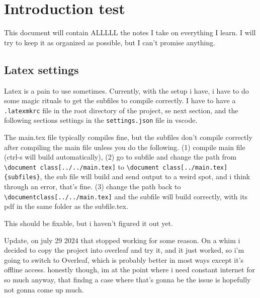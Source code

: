 \documentclass[../../main.tex]{subfiles} %
\begin{document}
\chapter{Introduction test}

This document will contain ALLLLL the notes I take on everything I learn. I will try to keep it as organized as possible, but I can't promise anything.

\section{Latex settings}
Latex is a pain to use sometimes. Currently, with the setup i have, i have to do some magic rituals to get the subfiles to compile correctly. I have to have a \texttt{.latexmkrc} file in the root directory of the project, se next section, and the following sections settings in the \texttt{settings.json} file in vscode.

The main.tex file typically compiles fine, but the subfiles don't compile correctly after compiling the main file unless you do the following. (1) compile main file (ctrl-s will build automatically), (2) go to subfile and change the path from \verb|\document class[../../main.tex]| to \verb|\document class[../main.tex]{subfiles}|, the sub file will build and send output to a weird spot, and i think through an error, that's fine. (3) change the path back to \verb|\documentclass[../../main.tex]| and the subfile will build correctly, with its pdf in the same folder as the subfile.tex. 

This should be fixable, but i haven't figured it out yet.

Update, on july 29 2024 that stopped working for some reason. On a whim i decided to copy the project into overleaf and try it, and it just worked, so i'm going to switch to Overleaf, which is probably better in most ways except it's offline access. honestly though, im at the point where i need constant internet for so much anyway, that findng a case where that's gonna be the issue is hopefully not gonna come up much. 
\end{document}
